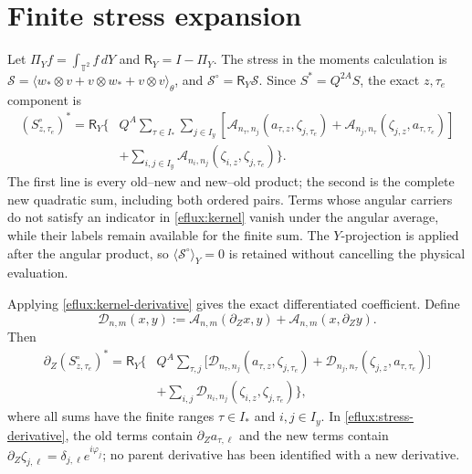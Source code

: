 \documentclass[11pt]{article}
\begin{document}
\section{Finite stress expansion}
Let $\Pi_Y f=\int_{\mathbb T^2}f\,dY$ and $\mathsf R_Y=I-\Pi_Y$.
The stress in the moments calculation is
$\mathcal S=\langle w_*\otimes v+v\otimes w_*+v\otimes v\rangle_\theta$,
and $\mathcal S^\circ=\mathsf R_Y\mathcal S$.  Since
$S^*=Q^{2A}S$, the exact $z,\tau_e$ component is
\begin{align}
 (S^\circ_{z,\tau_e})^*
 =\mathsf R_Y\Bigg\{&Q^A\sum_{\tau\in I_*}\sum_{j\in I_y}
 \left[\mathcal A_{n_\tau,n_j}(a_{\tau,z},\zeta_{j,\tau_e})
       +\mathcal A_{n_j,n_\tau}(\zeta_{j,z},a_{\tau,\tau_e})\right]
 \nonumber\\[-2pt]
 &+\sum_{i,j\in I_y}
       \mathcal A_{n_i,n_j}(\zeta_{i,z},\zeta_{j,\tau_e})\Bigg\}.
 \tag{E4}\label{eflux:stress}
\end{align}
The first line is every old--new and new--old product; the second is the
complete new quadratic sum, including both ordered pairs.  Terms whose
angular carriers do not satisfy an indicator in \eqref{eflux:kernel} vanish
under the angular average, while their labels remain available for the
finite sum.  The $Y$-projection is applied after the angular product, so
$\langle\mathcal S^\circ\rangle_Y=0$ is retained without cancelling the
physical evaluation.

Applying \eqref{eflux:kernel-derivative} gives the exact differentiated
coefficient.  Define
\[
 \mathcal D_{n,m}(x,y):=\mathcal A_{n,m}(\partial_Zx,y)
                       +\mathcal A_{n,m}(x,\partial_Zy).
\]
Then
\begin{align}
 \partial_Z(S^\circ_{z,\tau_e})^*=\mathsf R_Y\Bigg\{&Q^A\sum_{\tau,j}
 \big[\mathcal D_{n_\tau,n_j}(a_{\tau,z},\zeta_{j,\tau_e})
      +\mathcal D_{n_j,n_\tau}(\zeta_{j,z},a_{\tau,\tau_e})\big]
 \nonumber\\
 &+\sum_{i,j}\mathcal D_{n_i,n_j}(\zeta_{i,z},\zeta_{j,\tau_e})\Bigg\},
 \tag{E5}\label{eflux:stress-derivative}
\end{align}
where all sums have the finite ranges $\tau\in I_*$ and $i,j\in I_y$.
In \eqref{eflux:stress-derivative}, the old terms contain
$\partial_Za_{\tau,\ell}$ and the new terms contain
$\partial_Z\zeta_{j,\ell}=\delta_{j,\ell}e^{i\varphi_j}$; no parent derivative
has been identified with a new derivative.
\end{document}
